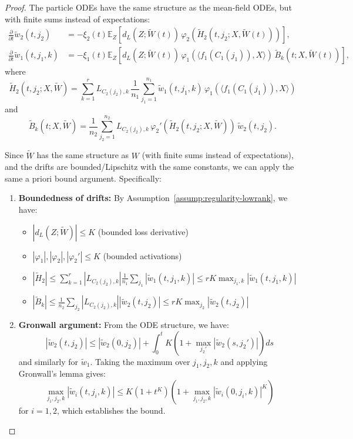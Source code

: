 \documentclass[11pt]{article}
\newcommand{\1}{\mathbbm{1}}
\begin{document}
\begin{proof}
The particle ODEs have the same structure as the mean-field ODEs, but with finite sums instead of expectations:
\begin{align*}
\frac{\partial}{\partial t}\tilde{w}_2(t, j_2) &= -\xi_2(t)\mathbb{E}_Z\left[d_L(Z; \tilde{W}(t))\,\varphi_2(\tilde{H}_2(t, j_2; X, \tilde{W}(t)))\right],\\
\frac{\partial}{\partial t}\tilde{w}_1(t, j_1, k) &= -\xi_1(t)\mathbb{E}_Z\left[d_L(Z; \tilde{W}(t))\,\varphi_1(\langle f_1(C_1(j_1)), X\rangle)\,\tilde{B}_k(t; X, \tilde{W}(t))\right],
\end{align*}
where
\[
\tilde{H}_2(t, j_2; X, \tilde{W}) = \sum_{k=1}^r L_{C_2(j_2),k}\,\frac{1}{n_1}\sum_{j_1=1}^{n_1} \tilde{w}_1(t, j_1, k)\,\varphi_1(\langle f_1(C_1(j_1)), X\rangle)
\]
and
\[
\tilde{B}_k(t; X, \tilde{W}) = \frac{1}{n_2}\sum_{j_2=1}^{n_2} L_{C_2(j_2),k}\,\varphi_2'(\tilde{H}_2(t, j_2; X, \tilde{W}))\,\tilde{w}_2(t, j_2).
\]

Since $\tilde{W}$ has the same structure as $W$ (with finite sums instead of expectations), and the drifts are bounded/Lipschitz with the same constants, we can apply the same a priori bound argument. Specifically:

\begin{enumerate}
\item \textbf{Boundedness of drifts:} By Assumption~\ref{assump:regularity-lowrank}, we have:
\begin{itemize}
\item $|d_L(Z; \tilde{W})| \le K$ (bounded loss derivative)
\item $|\varphi_1|, |\varphi_2|, |\varphi_2'| \le K$ (bounded activations)
\item $|\tilde{H}_2| \le \sum_{k=1}^r |L_{C_2(j_2),k}| \frac{1}{n_1}\sum_{j_1} |\tilde{w}_1(t, j_1, k)| \le rK \max_{j_1,k} |\tilde{w}_1(t, j_1, k)|$
\item $|\tilde{B}_k| \le \frac{1}{n_2}\sum_{j_2} |L_{C_2(j_2),k}| |\tilde{w}_2(t, j_2)| \le rK \max_{j_2} |\tilde{w}_2(t, j_2)|$
\end{itemize}

\item \textbf{Gronwall argument:} From the ODE structure, we have:
\[
|\tilde{w}_2(t, j_2)| \le |\tilde{w}_2(0, j_2)| + \int_0^t K(1 + \max_{j_2'} |\tilde{w}_2(s, j_2')|) ds
\]
and similarly for $\tilde{w}_1$. Taking the maximum over $j_1, j_2, k$ and applying Gronwall's lemma gives:
\[
\max_{j_1,j_2,k} |\tilde{w}_i(t, j_i, k)| \le K(1+t^K)(1+\max_{j_1,j_2,k} |\tilde{w}_i(0, j_i, k)|^K)
\]
for $i=1,2$, which establishes the bound.
\end{enumerate}
\end{proof}
\end{document}
